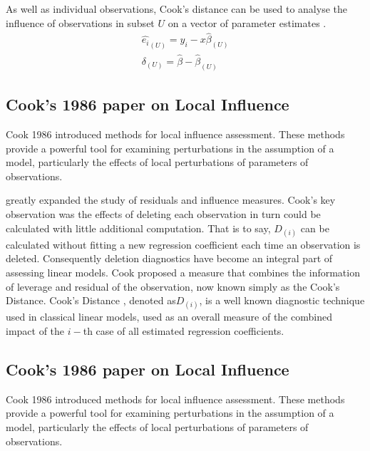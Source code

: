 \documentclass[Main.tex]{subfiles}
\begin{document}
As well as individual observations, Cook's distance can be used to analyse the influence of observations in subset $U$ on a vector of parameter estimates \citep{cook77}.
\begin{eqnarray}
\hat{e_{i}}_{(U)} = y_{i} - x\hat{\beta}_{(U)}\\
\delta_{(U)} = \hat{\beta} - \hat{\beta}_{(U)}
\end{eqnarray}


\subsection{Cook's 1986 paper on Local Influence}%
Cook 1986 introduced methods for local influence assessment. These methods provide a powerful tool for examining perturbations in the assumption of a model, particularly the effects of local perturbations of parameters of observations.


\citet{cook77} greatly expanded the study of residuals and influence measures.  Cook's key observation was the effects of deleting each observation in turn could be calculated with little additional computation. That is to say, $D_{(i)}$ can be calculated without fitting a new regression coefficient each time an observation is deleted.  Consequently deletion diagnostics have become an integral part of assessing linear models. Cook proposed a measure that combines the information of leverage and residual of the observation, now known simply as the Cook's Distance. Cook's Distance , denoted as$D_{(i)}$, is a well known diagnostic technique used in classical linear models, used as an overall measure of the combined impact of the $i-$th case of all estimated regression coefficients.


\subsection{Cook's 1986 paper on Local Influence}%
Cook 1986 introduced methods for local influence assessment. These methods provide a powerful tool for examining perturbations in the assumption of a model, particularly the effects of local perturbations of parameters of observations.
\end{document}
